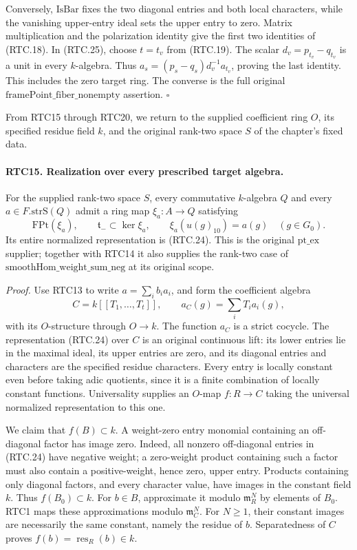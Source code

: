 Conversely, \(\mathrm{IsBar}\) fixes the two diagonal entries
and both local characters, while the vanishing upper-entry ideal
sets the upper entry to zero.  Matrix multiplication and the
polarization identity give the first two identities of (RTC.18).
In (RTC.25), choose \(t=t_v\) from (RTC.19).  The scalar
\(d_v=p_{t_v}-q_{t_v}\) is a unit in every \(k\)-algebra.
Thus
\(a_s=(p_s-q_s)d_v^{-1}a_{t_v}\), proving the last identity.
This includes the zero target ring.  The converse is the full
original \(\mathrm{framePoint\_fiber\_nonempty}\) assertion.
\hfill\(\square\)

From RTC15 through RTC20, we return to the supplied coefficient
ring \(O\), its specified residue field \(k\), and the original
rank-two space \(S\) of the chapter's fixed data.

\paragraph{RTC15. Realization over every prescribed target algebra.}
\label{claim:RTC15}
For the supplied rank-two space \(S\), every commutative
\(k\)-algebra \(Q\) and every \(a\in F.\mathrm{strS}(Q)\)
admit a ring map \(\xi_a:A\to Q\) satisfying
\[
 \mathrm{FPt}(\xi_a),\qquad
 \mathfrak t_-\subset\ker\xi_a,\qquad
 \xi_a(u(g)_{10})=a(g)\quad(g\in G_0).
                                                        \tag{RTC.26}
\]
Its entire normalized representation is (RTC.24).  This is the
original \(\mathrm{pt\_ex}\) supplier; together with RTC14 it
also supplies the rank-two case of
\(\mathrm{smoothHom\_weight\_sum\_neg}\) at its original scope.

\emph{Proof.}
Use RTC13 to write \(a=\sum_i b_i a_i\), and form the
coefficient algebra
\[
 C=k[[T_1,\ldots,T_t]],\qquad
       a_C(g)=\sum_i T_i a_i(g),
                                                        \tag{RTC.27}
\]
with its \(O\)-structure through \(O\to k\).  The function
\(a_C\) is a strict cocycle.  The representation (RTC.24) over
\(C\) is an original continuous lift: its lower entries lie in
the maximal ideal, its upper entries are zero, and its diagonal
entries and characters are the specified residue characters.
Every entry is locally constant even before taking adic quotients,
since it is a finite combination of locally constant functions.
Universality supplies an \(O\)-map \(f:R\to C\) taking the
universal normalized representation to this one.

We claim that \(f(B)\subset k\).  A weight-zero entry monomial
containing an off-diagonal factor has image zero.  Indeed, all
nonzero off-diagonal entries in (RTC.24) have negative weight;
a zero-weight product containing such a factor must also contain
a positive-weight, hence zero, upper entry.  Products containing
only diagonal factors, and every character value, have images in
the constant field \(k\).  Thus \(f(B_0)\subset k\).
For \(b\in B\), approximate it modulo \(\mathfrak m_R^N\)
by elements of \(B_0\).  RTC1 maps these approximations modulo
\(\mathfrak m_C^N\).  For \(N\geq1\), their constant images
are necessarily the same constant, namely the residue of \(b\).
Separatedness of \(C\) proves
\(f(b)=\operatorname{res}_R(b)\in k\).

